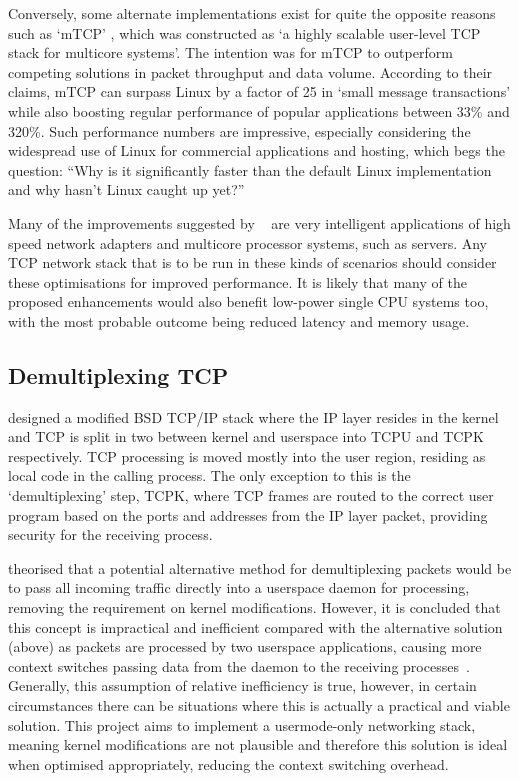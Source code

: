 \documentclass[11pt,a4paper,british]{bhamarticle}
\begin{document}
\begin{multicols}{2}
Conversely, some alternate implementations exist for quite the opposite reasons such as `mTCP' \citeauthor{jeong2014mtcp}, which was constructed as `a highly scalable user-level TCP stack for multicore systems'. The intention was for mTCP to outperform competing solutions in packet throughput and data volume. According to their claims, mTCP can surpass Linux by a factor of 25 in `small message transactions' while also boosting regular performance of popular applications between 33\% and 320\%. Such performance numbers are impressive, especially considering the widespread use of Linux for commercial applications and hosting, which begs the question: ``Why is it significantly faster than the default Linux implementation and why hasn't Linux caught up yet?''~\cite[2.2, 3]{jeong2014mtcp}

Many of the improvements suggested by \citeauthor{jeong2014mtcp}~\cite{jeong2014mtcp} are very intelligent applications of high speed network adapters and multicore processor systems, such as servers. Any TCP network stack that is to be run in these kinds of scenarios should consider these optimisations for improved performance. It is likely that many of the proposed enhancements would also benefit low-power single CPU systems too, with the most probable outcome being reduced latency and memory usage.

\subsection{Demultiplexing TCP}
\citeauthor{braun:inria-00074040} designed a modified BSD TCP/IP stack where the IP layer resides in the kernel and TCP is split in two between kernel and userspace into TCPU and TCPK respectively. TCP processing is moved mostly into the user region, residing as local code in the calling process. The only exception to this is the `demultiplexing' step, TCPK, where TCP frames are routed to the correct user program based on the ports and addresses from the IP layer packet, providing security for the receiving process.

\citeauthor{braun:inria-00074040} theorised that a potential alternative method for demultiplexing packets would be to pass all incoming traffic directly into a userspace daemon for processing, removing the requirement on kernel modifications. However, it is concluded that this concept is impractical and inefficient compared with the alternative solution (above) as packets are processed by two userspace applications, causing more context switches passing data from the daemon to the receiving processes~\cite[2.1]{braun:inria-00074040}\cite[3]{edwards1995experiences}. Generally, this assumption of relative inefficiency is true, however, in certain circumstances there can be situations where this is actually a practical and viable solution. This project aims to implement a usermode-only networking stack, meaning kernel modifications are not plausible and therefore this solution is ideal when optimised appropriately, reducing the context switching overhead.


\end{multicols}
\end{document}
